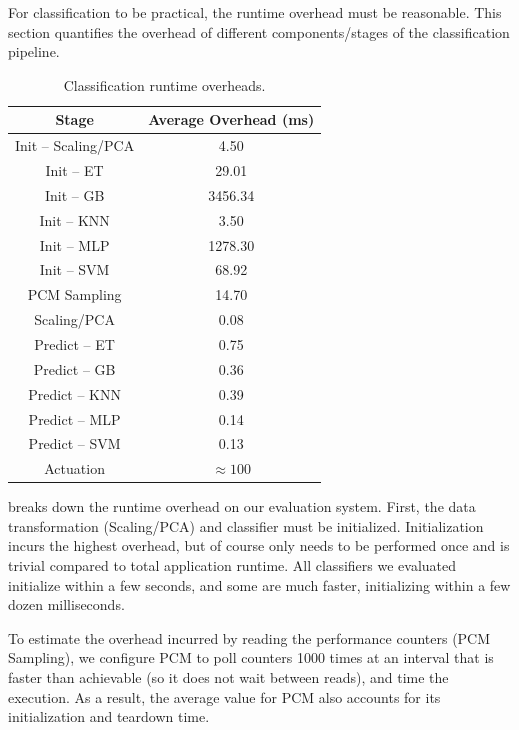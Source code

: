 For classification to be practical, the runtime overhead must be reasonable.
This section quantifies the overhead of different components/stages of the classification pipeline.

\begin{table}[th]
\caption{Classification runtime overheads.}
\label{tbl:classifiers-overhead}
\small
\centering
\begin{tabular}{c|c}
  \textbf{Stage} & \textbf{Average Overhead (ms)} \\
  \hline
  \hline
  Init -- Scaling/PCA & 4.50 \\
  Init -- ET          & 29.01 \\
  Init -- GB          & 3456.34 \\
  Init -- KNN         & 3.50 \\
  Init -- MLP         & 1278.30 \\
  Init -- SVM         & 68.92 \\
  \hline
  PCM Sampling        & 14.70 \\
  Scaling/PCA         & 0.08 \\
  Predict -- ET       & 0.75 \\
  Predict -- GB       & 0.36 \\
  Predict -- KNN      & 0.39 \\
  Predict -- MLP      & 0.14 \\
  Predict -- SVM      & 0.13 \\
  Actuation & $\approx 100$ \\
  \hline
  \hline
\end{tabular}
\end{table}

 breaks down the runtime overhead on our evaluation system.
First, the data transformation (Scaling/PCA) and classifier must be initialized.
Initialization incurs the highest overhead, but of course only needs to be performed once and is trivial compared to total application runtime.
All classifiers we evaluated initialize within a few seconds, and some are much faster, initializing within a few dozen milliseconds.

To estimate the overhead incurred by reading the performance counters (PCM Sampling), we configure PCM to poll counters 1000 times at an interval that is faster than achievable (so it does not wait between reads), and time the execution.
As a result, the average value for PCM also accounts for its initialization and teardown time.

